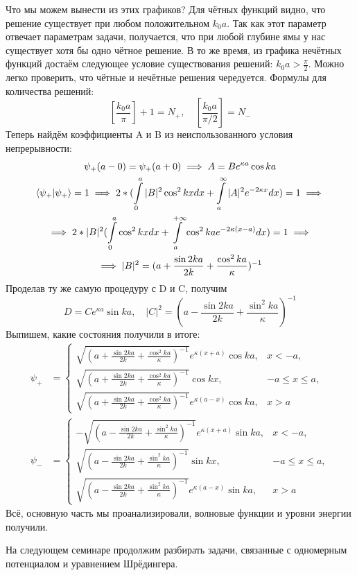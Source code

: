 Что мы можем вынести из этих графиков? Для чётных функций видно, что решение существует при любом положительном $k_0a$. Так как этот параметр отвечает параметрам задачи, получается, что при любой глубине ямы у нас существует хотя бы одно чётное решение. В то же время, из графика нечётных функций достаём следующее условие существования решений: $k_0a>\frac{\pi}{2}$. Можно легко проверить, что чётные и нечётные решения чередуется. Формулы для количества решений:
\[
\left[\frac{k_0a}{\pi}\right] + 1 = N_+, \quad \left[\frac{k_0a}{\pi/2}\right] = N_-
\]
Теперь найдём коэффициенты A и B из неиспользованного условия непрерывности:
\begin{gather*}
    \psi_+(a-0) = \psi_+(a+0) \implies A = Be^{\kappa a}\cos ka \\
    \braket{\psi_+} = 1 \implies 2 * (\int\limits_0^a |B|^2\cos^2 kx dx + \int\limits_a^\infty |A|^2e^{-2\kappa x} dx) = 1 \implies \\
    \implies 2 *|B|^2 (\int\limits_0^a \cos^2 kx dx + \int\limits_a^{+\infty }\cos^2 kae^{-2\kappa(x-a)} dx) = 1 \implies \\
    \implies |B|^2 = (a + \frac{\sin 2ka}{2k} + \frac{\cos^2 ka}{\kappa})^{-1} 
\end{gather*}
Проделав ту же самую процедуру с D и C, получим
\[
D = Ce^{\kappa a}\sin ka, \quad |C|^2 = (a - \frac{\sin 2ka}{2k} + \frac{\sin^2 ka}{\kappa})^{-1}
\]
Выпишем, какие состояния получили в итоге:
\begin{align*}
\psi_+ &=
\begin{cases}
    \sqrt{(a + \frac{\sin 2ka}{2k} + \frac{\cos^2 ka}{\kappa})^{-1}}e^{\kappa (x + a)}\cos{ka}, & x < -a,\\
    \sqrt{(a + \frac{\sin 2ka}{2k} + \frac{\cos^2 ka}{\kappa})^{-1}} \cos kx, & -a \leq x \leq a,\\
    \sqrt{(a + \frac{\sin 2ka}{2k} + \frac{\cos^2 ka}{\kappa})^{-1}}e^{\kappa (a - x)}\cos{ka},& x > a
\end{cases}\\
\psi_- &=
\begin{cases}
    -\sqrt{(a - \frac{\sin 2ka}{2k} + \frac{\sin^2 ka}{\kappa})^{-1}}e^{\kappa (x+a)}\sin ka, & x < -a,\\
    \sqrt{(a - \frac{\sin 2ka}{2k} + \frac{\sin^2 ka}{\kappa})^{-1}} \sin kx, & -a \leq x \leq a,\\
    \sqrt{(a - \frac{\sin 2ka}{2k} + \frac{\sin^2 ka}{\kappa})^{-1}}e^{\kappa (a-x)}\sin ka, & x > a
\end{cases}
\end{align*}
Всё, основную часть мы проанализировали, волновые функции и уровни энергии получили.

На следующем семинаре продолжим разбирать задачи, связанные с одномерным потенциалом и уравнением Шрёдингера.
